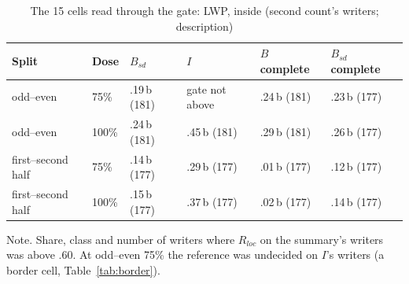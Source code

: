 \begin{table}[htbp]
\caption{The 15 cells read through the gate: LWP, inside (second count's writers; description)}
\label{tab:gatecells}
\footnotesize
\begin{tabularx}{\linewidth}{@{}llXXXX@{}}
\toprule
Split & Dose & $B_{sd}$ & $I$ & $B$ complete & $B_{sd}$ complete \\
\midrule
odd--even & 75\% & .19\,b (181) & gate not above & .24\,b (181) & .23\,b (177) \\
odd--even & 100\% & .24\,b (181) & .45\,b (181) & .29\,b (181) & .26\,b (177) \\
first--second half & 75\% & .14\,b (177) & .29\,b (177) & .01\,b (177) & .12\,b (177) \\
first--second half & 100\% & .15\,b (177) & .37\,b (177) & .02\,b (177) & .14\,b (177) \\
\bottomrule
\end{tabularx}
\par\smallskip\footnotesize Note. Share, class and number of writers where $R_{loc}$ on the summary's writers was above .60. At odd--even 75\% the reference was undecided on $I$'s writers (a border cell, Table~\ref{tab:border}).
\end{table}
